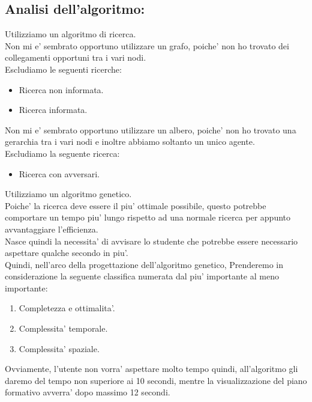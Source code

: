 \documentclass[10pt,a4paper]{article}
\begin{document}
    \subsection{Analisi dell'algoritmo:}
      \label{analisiDellAlgoritmo}
        Utilizziamo un algoritmo di ricerca.\\
        Non mi e' sembrato opportuno utilizzare un grafo, poiche' non ho trovato dei collegamenti opportuni 
        tra i vari nodi.\\
        Escludiamo le seguenti ricerche:
        \begin{itemize}
          \item Ricerca non informata.
          \item Ricerca informata.
        \end{itemize}
        Non mi e' sembrato opportuno utilizzare un albero, poiche' non ho trovato una gerarchia tra i vari nodi e 
        inoltre abbiamo soltanto un unico agente.\\
        Escludiamo la seguente ricerca:
        \begin{itemize}
          \item Ricerca con avversari.
        \end{itemize}
        Utilizziamo un algoritmo genetico.\\
        Poiche' la ricerca deve essere il piu' ottimale possibile, questo 
        potrebbe comportare un tempo piu' lungo rispetto ad una normale ricerca per appunto avvantaggiare l'efficienza.\\
        Nasce quindi la necessita' di avvisare lo studente che potrebbe essere necessario aspettare qualche secondo in piu'.\\
        Quindi, nell'arco della progettazione dell'algoritmo genetico, Prenderemo in considerazione la 
        seguente classifica numerata dal piu' importante al meno importante:
        \begin{enumerate}
          \item Completezza e ottimalita'.
          \item Complessita' temporale.
          \item Complessita' spaziale.
        \end{enumerate}
        Ovviamente, l'utente non vorra' aspettare molto tempo quindi, all'algoritmo gli daremo del tempo 
        non superiore ai 10 secondi, mentre la visualizzazione del piano formativo avverra' dopo massimo 12 secondi.
\end{document}
